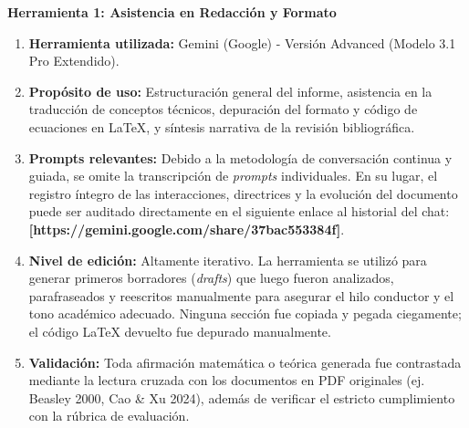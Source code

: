 \documentclass[letter, 10pt]{article}
\begin{document}
\vspace{0.3cm}
\noindent \textbf{Herramienta 1: Asistencia en Redacci\'on y Formato}
\begin{enumerate}
    \item \textbf{Herramienta utilizada:} Gemini (Google) - Versi\'on Advanced (Modelo 3.1 Pro Extendido).
    \item \textbf{Prop\'osito de uso:} Estructuraci\'on general del informe, asistencia en la traducci\'on de conceptos t\'ecnicos, depuraci\'on del formato y c\'odigo de ecuaciones en \LaTeX{}, y s\'intesis narrativa de la revisi\'on bibliogr\'afica.
    \item \textbf{Prompts relevantes:} Debido a la metodolog\'ia de conversaci\'on continua y guiada, se omite la transcripci\'on de \textit{prompts} individuales. En su lugar, el registro \'integro de las interacciones, directrices y la evoluci\'on del documento puede ser auditado directamente en el siguiente enlace al historial del chat: \textbf{[https://gemini.google.com/share/37bac553384f]}.
    \item \textbf{Nivel de edici\'on:} Altamente iterativo. La herramienta se utiliz\'o para generar primeros borradores (\textit{drafts}) que luego fueron analizados, parafraseados y reescritos manualmente para asegurar el hilo conductor y el tono acad\'emico adecuado. Ninguna secci\'on fue copiada y pegada ciegamente; el c\'odigo \LaTeX{} devuelto fue depurado manualmente.
    \item \textbf{Validaci\'on:} Toda afirmaci\'on matem\'atica o te\'orica generada fue contrastada mediante la lectura cruzada con los documentos en PDF originales (ej. Beasley 2000, Cao \& Xu 2024), adem\'as de verificar el estricto cumplimiento con la r\'ubrica de evaluaci\'on.
\end{enumerate}
\end{document}
